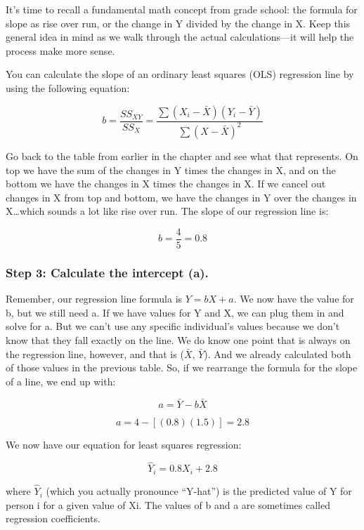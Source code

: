 \documentclass[
  letterpaper,
  DIV=11,
  numbers=noendperiod]{scrreprt}
\begin{document}
It's time to recall a fundamental math concept from grade school: the
formula for slope as rise over run, or the change in Y divided by the
change in X. Keep this general idea in mind as we walk through the
actual calculations---it will help the process make more sense. \,

You can calculate the slope of an ordinary least squares (OLS)
regression line by using the following equation:

\[
b = \frac{SS_{XY}}{SS_X}
= \frac{\sum (X_i - \bar{X})(Y_i - \bar{Y})}{\sum (X - \bar{X})^2}
\]

Go back to the table from earlier in the chapter and see what that
represents. On top we have the sum of the changes in Y times the changes
in X, and on the bottom we have the changes in X times the changes in X.
If we cancel out changes in X from top and bottom, we have the changes
in Y over the changes in X\ldots which sounds a lot like rise over run.
The slope of our regression line is:

\[
b = \frac{4}{5} = 0.8
\]

\subsubsection*{Step 3: Calculate the intercept
(a).\,}\label{step-3-calculate-the-intercept-a.}

Remember, our regression line formula is \(Y = bX + a\). We now have the
value for b, but we still need a. If we have values for Y and X, we can
plug them in and solve for a. But we can't use any specific individual's
values because we don't know that they fall exactly on the line. We do
know one point that is always on the regression line, however, and that
is (\(\bar{X}\), \(\bar{Y}\)). And we already calculated both of those
values in the previous table. So, if we rearrange the formula for the
slope of a line, we end up with:\,

\[
a = \bar{Y} - b\bar{X}
\]

\[
a = 4 - [(0.8)(1.5)] = 2.8
\]

We now have our equation for least squares regression:\,\,

\[
\hat{Y}_i = 0.8X_i + 2.8
\]

where \(\hat{Y}_i\) (which you actually pronounce ``Y-hat'') is the
predicted value of Y for person i for a given value of Xi. The values of
b and a are sometimes called regression coefficients.\,\,
\end{document}
